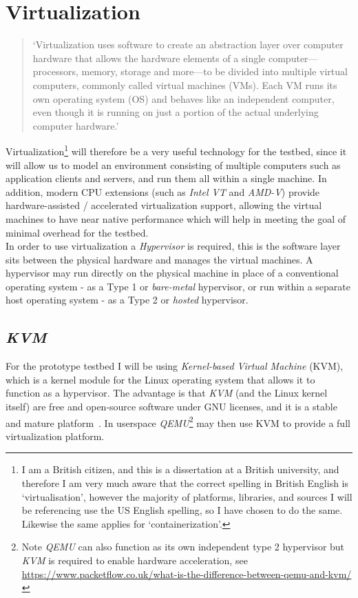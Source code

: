 \documentclass[
    author={Jacob Daniel Halsey},
    supervisor={Prof. Awais Rashid},
    degree={BSc},
    title={Building a Testbed for Evaluating Privacy Enhancing Technologies  (PETs)},
    subtitle={},
    type={software development},
    year={2021}
]{dissertation}
\begin{document}
\section{Virtualization}

\begin{quotation}
	`Virtualization uses software to create an abstraction layer over computer hardware that allows the hardware 
	elements of a single computer—processors, memory, storage and more—to be divided into multiple virtual computers, 
	commonly called virtual machines (VMs). Each VM runs its own operating system (OS) and behaves like an independent 
	computer, even though it is running on just a portion of the actual underlying computer hardware.'~\cite{ibm_virtualization}
\end{quotation}

Virtualization\footnote{I am a British citizen, and this is a dissertation at a British university, 
and therefore I am very much aware that the correct spelling in British English is `virtualisation', however the
majority of platforms, libraries, and sources I will be referencing use the US English spelling, 
so I have chosen to do the same. Likewise the same applies for `containerization'.}
 will therefore be a very useful technology for the testbed, since it will allow us to model
an environment consisting of multiple computers such as application clients and servers, and run
them all within a single machine. In addition, modern CPU extensions (such as \emph{Intel VT} and \emph{AMD-V}) 
provide hardware-assisted / accelerated virtualization support, allowing the virtual machines to 
have near native performance which will help in meeting the goal of minimal overhead for the testbed. \\

In order to use virtualization a \emph{Hypervisor} is required, this is the software layer sits between
the physical hardware and manages the virtual machines. A hypervisor may run directly on the physical machine
in place of a conventional operating system - as a Type 1 or \emph{bare-metal} hypervisor,
or run within a separate host operating system - as a Type 2 or \emph{hosted} hypervisor. \\

\subsection{\emph{KVM}}
\label{subsect:kvm}

For the prototype testbed I will be using \emph{Kernel-based Virtual Machine} (KVM), which is a 
kernel module for the Linux operating system that allows it to function as a hypervisor. 
The advantage is that \emph{KVM} (and the Linux kernel itself) are free and open-source software 
under GNU licenses, and it is a stable and mature platform~\cite{redhat_kvm}.
In userspace \emph{QEMU}\footnote{Note \emph{QEMU} can also function as its own independent type 2 hypervisor 
	but \emph{KVM} is required to enable hardware acceleration,
see \url{https://www.packetflow.co.uk/what-is-the-difference-between-qemu-and-kvm/}}
may then use KVM to provide a full virtualization platform. \\
\end{document}

